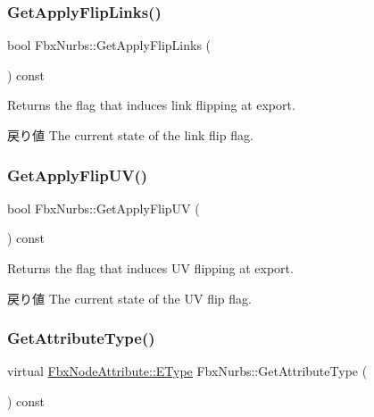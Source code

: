 \subsubsection{\texorpdfstring{Get\+Apply\+Flip\+Links()}{GetApplyFlipLinks()}}
{\footnotesize\ttfamily bool Fbx\+Nurbs\+::\+Get\+Apply\+Flip\+Links (\begin{DoxyParamCaption}{ }\end{DoxyParamCaption}) const}

Returns the flag that induces link flipping at export. \begin{DoxyReturn}{戻り値}
The current state of the link flip flag. 
\end{DoxyReturn}
\mbox{\label{class_fbx_nurbs_a1ad0c6471229c9e67da843f0895cb055}} 
\subsubsection{\texorpdfstring{Get\+Apply\+Flip\+U\+V()}{GetApplyFlipUV()}}
{\footnotesize\ttfamily bool Fbx\+Nurbs\+::\+Get\+Apply\+Flip\+UV (\begin{DoxyParamCaption}{ }\end{DoxyParamCaption}) const}

Returns the flag that induces UV flipping at export. \begin{DoxyReturn}{戻り値}
The current state of the UV flip flag. 
\end{DoxyReturn}
\mbox{\label{class_fbx_nurbs_a6c810e3a50538b346cbbf61338dca907}} 
\subsubsection{\texorpdfstring{Get\+Attribute\+Type()}{GetAttributeType()}}
{\footnotesize\ttfamily virtual \hyperlink{class_fbx_node_attribute_a08e1669d3d1a696910756ab17de56d6a}{Fbx\+Node\+Attribute\+::\+E\+Type} Fbx\+Nurbs\+::\+Get\+Attribute\+Type (\begin{DoxyParamCaption}{ }\end{DoxyParamCaption}) const\hspace{0.3cm}{\ttfamily [virtual]}}



